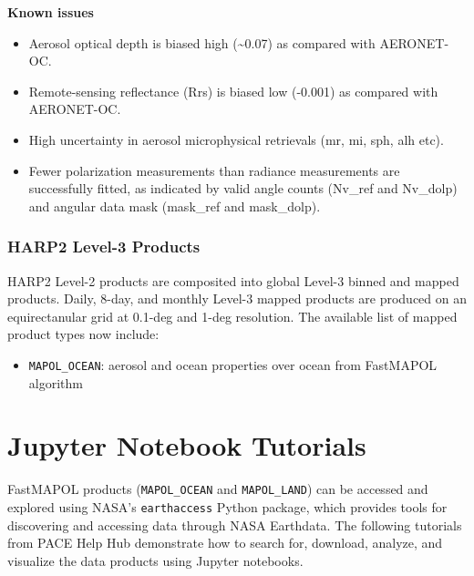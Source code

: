 \documentclass[
  11pt,
  letterpaper,
]{scrreprt}
\providecommand{\tightlist}{%
  \setlength{\itemsep}{0pt}\setlength{\parskip}{0pt}}
\begin{document}
\textbf{Known issues}

\begin{itemize}
\tightlist
\item
  Aerosol optical depth is biased high (\textasciitilde0.07) as compared
  with AERONET-OC.
\item
  Remote-sensing reflectance (Rrs) is biased low (-0.001) as compared
  with AERONET-OC.
\item
  High uncertainty in aerosol microphysical retrievals (mr, mi, sph, alh
  etc).
\item
  Fewer polarization measurements than radiance measurements are
  successfully fitted, as indicated by valid angle counts (Nv\_ref and
  Nv\_dolp) and angular data mask (mask\_ref and mask\_dolp).
\end{itemize}

\subsection*{HARP2 Level-3 Products}\label{harp2-level-3-products-1}

HARP2 Level-2 products are composited into global Level-3 binned and
mapped products. Daily, 8-day, and monthly Level-3 mapped products are
produced on an equirectanular grid at 0.1-deg and 1-deg resolution. The
available list of mapped product types now include:

\begin{itemize}
\tightlist
\item
  \texttt{MAPOL\_OCEAN}: aerosol and ocean properties over ocean from
  FastMAPOL algorithm
\end{itemize}


\chapter*{Jupyter Notebook Tutorials}\label{jupyter-notebook-tutorials}


FastMAPOL products (\texttt{MAPOL\_OCEAN} and \texttt{MAPOL\_LAND}) can
be accessed and explored using NASA's \texttt{earthaccess} Python
package, which provides tools for discovering and accessing data through
NASA Earthdata. The following tutorials from PACE Help Hub demonstrate
how to search for, download, analyze, and visualize the data products
using Jupyter notebooks.
\end{document}
